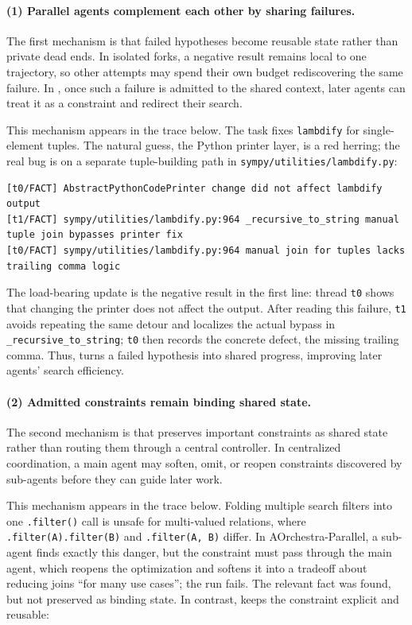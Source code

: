\vspace{-2mm}
\paragraph{(1) Parallel agents complement each other by sharing failures.}
The first mechanism is that failed hypotheses become reusable state rather than private dead ends. In isolated forks, a negative result remains local to one trajectory, so other attempts may spend their own budget rediscovering the same failure. In \toolName{}, once such a failure is admitted to the shared context, later agents can treat it as a constraint and redirect their search.

This mechanism appears in the trace below. The task fixes \texttt{lambdify} for single-element tuples. The natural guess, the Python printer layer, is a red herring; the real bug is on a separate tuple-building path in \texttt{sympy/\allowbreak utilities/\allowbreak lambdify.py}:

\begin{lstlisting}[style=gist]
[t0/FACT] AbstractPythonCodePrinter change did not affect lambdify output
[t1/FACT] sympy/utilities/lambdify.py:964 _recursive_to_string manual tuple join bypasses printer fix
[t0/FACT] sympy/utilities/lambdify.py:964 manual join for tuples lacks trailing comma logic
\end{lstlisting}
 
The load-bearing update is the negative result in the first line: thread \texttt{t0} shows that changing the printer does not affect the output. After reading this failure, \texttt{t1} avoids repeating the same detour and localizes the actual bypass in \texttt{\_recursive\_to\_string}; \texttt{t0} then records the concrete defect, the missing trailing comma. Thus, \toolName{} turns a failed hypothesis into shared progress, improving later agents' search efficiency.

\vspace{-2mm}
\paragraph{(2) Admitted constraints remain binding shared state.}
The second mechanism is that \toolName{} preserves important constraints as
shared state rather than routing them through a central controller. In centralized coordination, a main agent may soften, omit, or reopen constraints discovered by sub-agents before they can guide later work.
 
This mechanism appears in the trace below. Folding multiple search filters into one \texttt{.filter()} call is unsafe for multi-valued relations, where \texttt{.filter(A).\allowbreak filter(B)} and \texttt{.filter(A, B)} differ. In AOrchestra-Parallel, a sub-agent finds exactly this danger, but the constraint must pass through the main agent, which reopens the optimization and softens it into a tradeoff about reducing joins ``for many use cases''; the run fails. The relevant fact was found, but not preserved as binding state. In contrast, \toolName{} keeps the constraint explicit and reusable:
 
